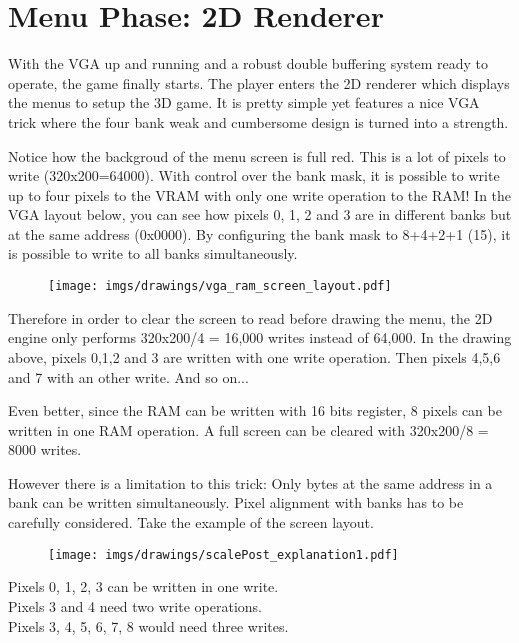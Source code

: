 \section{Menu Phase: 2D Renderer}
With the VGA up and running and a robust double buffering system ready to operate, the game finally starts. The player enters the 2D renderer which displays the menus to setup the 3D game. It is pretty simple yet features a nice VGA trick where the four bank weak and cumbersome design is turned into a strength.
\par
\begin{figure}[H]
\centering
{}
\end{figure}
\par

Notice how the backgroud of the menu screen is full red. This is a lot of pixels to write (320x200=64000). With control over the bank mask, it is possible to write up to four pixels to the VRAM with only one write operation to the RAM! In the VGA layout below, you can see how pixels 0, 1, 2 and 3 are in different banks but at the same address (0x0000). By configuring the bank mask to 8+4+2+1 (15), it is possible to write to all banks simultaneously.\\
\par
\begin{figure}[H]
\centering
\texttt{[image: imgs/drawings/vga\_ram\_screen\_layout.pdf]}
\end{figure}

\par
Therefore in order to clear the screen to read before drawing the menu, the 2D engine only performs 320x200/4 = 16,000 writes instead of 64,000. In the drawing above, pixels 0,1,2 and 3 are written with one write operation. Then pixels 4,5,6 and 7 with an other write. And so on...\\
\par
Even better, since the RAM can be written with 16 bits register, 8 pixels can be written in one RAM operation. A full screen can be cleared with 320x200/8 = 8000 writes.
\par
\begin{minipage}{\textwidth}

\end{minipage}
However there is a limitation to this trick: Only bytes at the same address in a bank can be written simultaneously. Pixel alignment with banks has to be carefully considered. Take the example of the screen layout.\
\par
\begin{figure}[H]
\centering
 \texttt{[image: imgs/drawings/scalePost\_explanation1.pdf]}
 \end{figure}
Pixels 0, 1, 2, 3 can be written in one write.\\
Pixels 3 and 4 need two write operations.\\
Pixels 3, 4, 5, 6, 7, 8 would need three writes.\\


